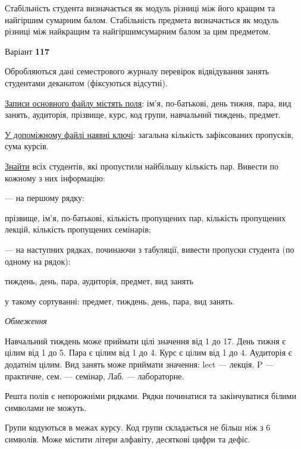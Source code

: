 \documentclass[11pt, ukrainian]{article}
\begin{document}
Стабільність студента визначається як модуль різниці між його кращим та найгіршим сумарним балом.
Стабільність предмета визначається як модуль різниці між найкращим та найгіршимсумарним балом за цим предметом.






\par
\newpage
{\center Варіант  \No \textbf { 117 }\par}
\bigskip
Обробляються дані семестрового журналу перевірок відвідування занять студентами деканатом (фіксуються відсутні). 

\underline{Записи основного файлу містять поля}: ім’я, по-батькові, день тижня, пара, вид занять, аудиторія, прізвище, курс, код групи, навчальний тиждень, предмет.

\underline{У допоміжному файлі наявні ключі}: загальна кількість зафіксованих пропусків, сума курсів.

\underline{Знайти} всіх студентів, які пропустили найбільшу кількість пар. Вивести по кожному з них інформацію:\par
{\noindent}--- на першому рядку:\par
прізвище, ім’я, по-батькові, кількість пропущених пар, кількість пропущених лекцій, кількість пропущених семінарів;

{\noindent}--- на наступних рядках, починаючи з табуляції, вивести пропуски студента (по одному на рядок):\par
тиждень, день, пара, аудиторія, предмет, вид занять

{\noindent}у такому сортуванні: предмет, тиждень, день, пара, вид занять.


\bigskip\textit{Обмеження}

Навчальний тиждень може приймати цілі значення від 1 до 17.
День тижня є цілим від 1 до 5. Пара є цілим від 1 до 4.
Курс є цілим від 1 до 4. Аудиторія є додатнім цілим.
Вид занять може приймати значення:
lect --- лекція, P --- практичне, сем. --- семінар, Лаб. --- лабораторне.

Решта полів є непорожніми рядками.
Рядки починатися та закінчуватися білими символами не можуть.

Групи кодуються в межах курсу.
Код групи складається не більш ніж з 6 символів.
Може містити літери алфавіту, десяткові цифри та дефіс.
\end{document}
